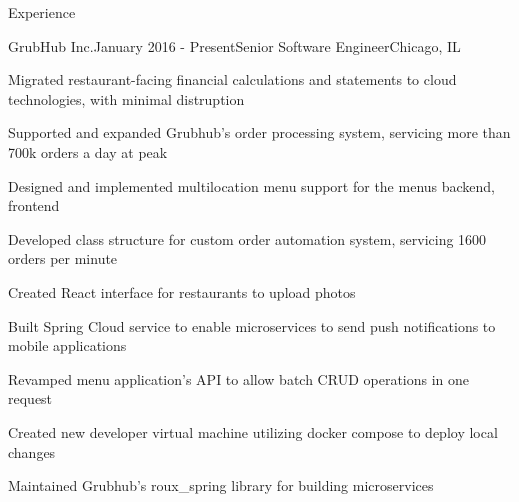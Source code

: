 \documentclass{resume} %
\begin{document}



\begin{rSection}{Experience}


\begin{rSubsection}{GrubHub Inc.}{January 2016 - Present}{Senior Software Engineer}{Chicago, IL}
\item Migrated restaurant-facing financial calculations and statements to cloud technologies, with minimal distruption
\item Supported and expanded Grubhub's order processing system, servicing more than 700k orders a day at peak
\item Designed and implemented multilocation menu support for the menus backend, frontend
\item Developed class structure for custom order automation system, servicing 1600 orders per minute
\item Created React interface for restaurants to upload photos
\item Built Spring Cloud service to enable microservices to send push notifications to mobile applications
\item Revamped menu application's API to allow batch CRUD operations in one request
\item Created new developer virtual machine utilizing docker compose to deploy local changes
\item Maintained Grubhub's roux\_spring library for building microservices
\end{rSubsection}



\end{rSection}
\end{document}
